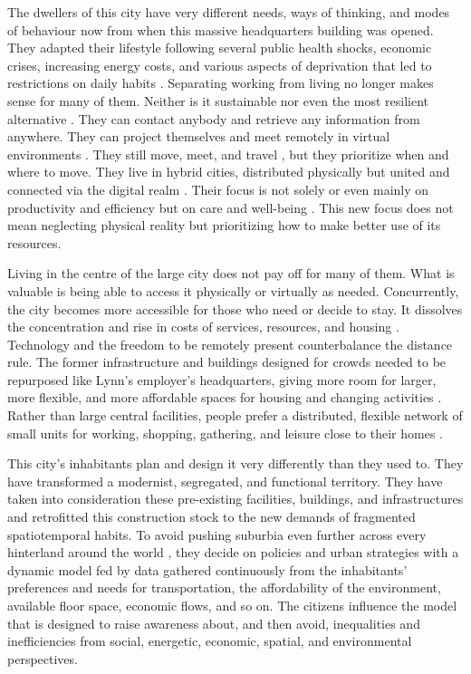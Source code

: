 The dwellers of this city have very different needs, ways of thinking, and modes of behaviour now from when this massive headquarters building was opened. They adapted their lifestyle following several public health shocks, economic crises, increasing energy costs, and various aspects of deprivation that led to restrictions on daily habits \citep{Bradley2007, Dobkowski2002, Meadows1972}. Separating working from living no longer makes sense for many of them. Neither is it sustainable nor even the most resilient alternative \citep{Belzunegui-Eraso2020}. They can contact anybody and retrieve any information from anywhere. They can project themselves and meet remotely in virtual environments \citep{townsend2013smart}. They still move, meet, and travel \citep{DeAbreueSilva2018, Zahavi1974}, but they prioritize when and where to move. They live in hybrid cities, distributed physically but united and connected via the digital realm \citep{Lim2022}. Their focus is not solely or even mainly on productivity and efficiency but on care and well-being \citep{AmannAlcocer2005, Dominoni2022}. This new focus does not mean neglecting physical reality \citep{Geraci2010} but prioritizing how to make better use of its resources. 

Living in the centre of the large city does not pay off for many of them. What is valuable is being able to access it physically or virtually as needed. Concurrently, the city becomes more accessible for those who need or decide to stay. It dissolves the concentration and rise in costs of services, resources, and housing \citep{Bettencourt2007}. Technology and the freedom to be remotely present counterbalance the distance rule. The former infrastructure and buildings designed for crowds needed to be repurposed like Lynn’s employer’s headquarters, giving more room for larger, more flexible, and more affordable spaces for housing and changing activities \citep{Pask1969}. Rather than large central facilities, people prefer a distributed, flexible network of small units for working, shopping, gathering, and leisure close to their homes \citep{Camocini2011TeleworkingWorkplace, Garavaglia2020, Moreno2021, Zenkteler2019Home-basedResponse}.

This city’s inhabitants plan and design it very differently than they used to. They have transformed a modernist, segregated, and functional territory. They have taken into consideration these pre-existing facilities, buildings, and infrastructures and retrofitted this construction stock to the new demands of fragmented spatiotemporal habits. To avoid pushing suburbia even further \citep{Nilles1991} across every hinterland around the world \citep{Brenner2012}, they decide on policies and urban strategies with a dynamic model \citep{Acheampong2015, White2015} fed by data gathered continuously from the inhabitants’ preferences and needs for transportation, the affordability of the environment, available floor space, economic flows, and so on. The citizens influence the model that is designed to raise awareness about, and then avoid, inequalities and inefficiencies from social, energetic, economic, spatial, and environmental perspectives.
 

